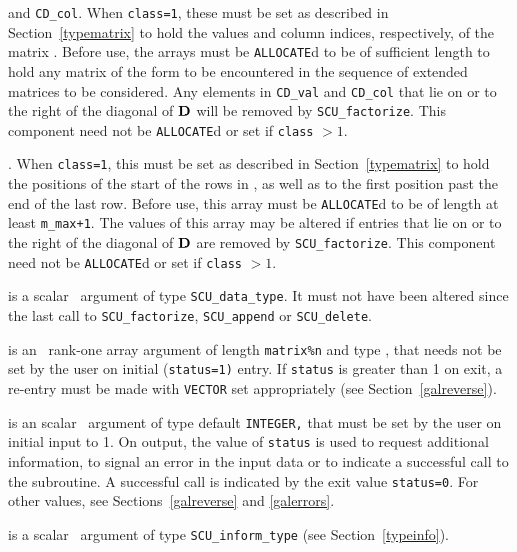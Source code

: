 \documentclass{galahad}
\newcommand{\packagename}{SCU}
\begin{document}
\begin{description}
\begin{description}
 and {\tt CD\_col}.   
When {\tt class=1}, 
these must be set as described in Section~\ref{typematrix} to hold the 
values and column indices, respectively, of the matrix .  
Before use, the arrays must be {\tt ALLOCATE}d 
to be of sufficient length to hold any matrix of the form  
to be encountered in the sequence of 
extended matrices to be considered. Any elements in 
{\tt CD\_val} and {\tt CD\_col} 
that lie on or to the right of the diagonal of ${\mathbf{D}}$ will be removed by  
{\tt \packagename\_factorize}. 
This component need not be {\tt ALLOCATE}d or set if {\tt class} $> 1$. 
 
. When {\tt class=1}, 
this must be set as described in Section~\ref{typematrix} to hold the 
positions of the start of the rows in , as well as to the first 
position past the end of the last row. 
Before use, this array must be {\tt ALLOCATE}d to be of length at least 
{\tt m\_max+1}. 
The values of this array may be altered if entries that lie on or to the 
right of the diagonal of ${\mathbf{D}}$ are removed by {\tt \packagename\_factorize}. 
This component need not be {\tt ALLOCATE}d or set if {\tt class} $> 1$. 
 
\end{description} 
 
 is a scalar \intentinout\ argument of type 
{\tt \packagename\_data\_type}. 
It must not have been altered since the last call to  
{\tt \packagename\_factorize}, 
{\tt \packagename\_append} or 
{\tt \packagename\_delete}. 
 
 is an \intentinout\ rank-one array argument of length 
{\tt matrix\%n} 
and type \realdp, 
that needs not be set by 
the user on initial ({\tt status=1)} entry. If {\tt status} is greater than 
1 on exit, a re-entry must be made with {\tt VECTOR} set appropriately 
(see Section~\ref{galreverse}). 
 
 is an scalar \intentinout\ argument of type 
default {\tt INTEGER,} that  
must be set by the user on initial input to 1. On output, the value of 
{\tt status} 
is used to request additional information, to signal an error 
in the input data or to indicate a successful call to the subroutine. 
A successful call is indicated by the exit value {\tt status=0}. 
For other values, see Sections~\ref{galreverse} and \ref{galerrors}. 
 
 is a scalar \intentinout\ argument of type 
{\tt \packagename\_inform\_type} 
(see Section~\ref{typeinfo}). 
 
\end{description}
\end{document}
